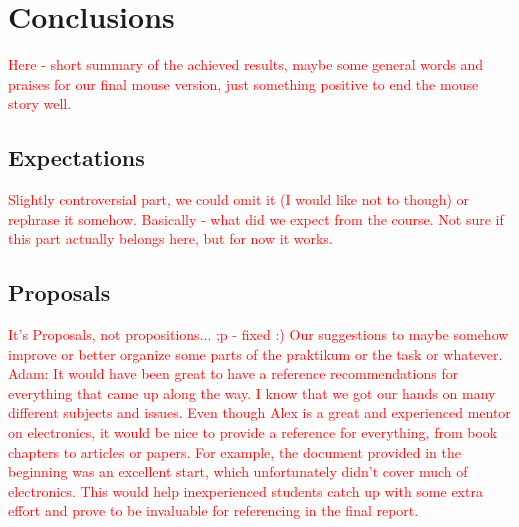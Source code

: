 \section{Conclusions}
\textcolor{red}{
Here - short summary of the achieved results, maybe some general words and praises for our final mouse version, just something positive to end the mouse story well.
}

\subsection{Expectations}
\textcolor{red}{
Slightly controversial part, we could omit it (I would like not to though) or rephrase it somehow. Basically - what did we expect from the course. Not sure if this part actually belongs here, but for now it works.
}
\subsection{Proposals}
\textcolor{red}{It's Proposals, not propositions... ;p - fixed :)}
\textcolor{red}{
Our suggestions to maybe somehow improve or better organize some parts of the praktikum or the task or whatever.
Adam: It would have been great to have a reference recommendations for everything that came up along the way. I know that we got our hands on many different subjects and issues. Even though Alex is a great and experienced mentor on electronics, it would be nice to provide a reference for everything, from book chapters to articles or papers. For example, the document provided in the beginning was an excellent start, which unfortunately didn't cover much of electronics. This would help inexperienced students catch up with some extra effort and prove to be invaluable for referencing in the final report.
}

